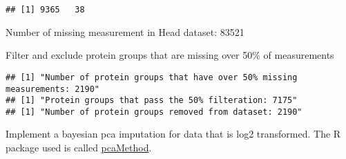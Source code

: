 \documentclass[]{article}
\begin{document}
\begin{verbatim}
## [1] 9365   38
\end{verbatim}

Number of missing measurement in Head dataset: 83521

Filter and exclude protein groups that are missing over 50\% of
measurements

\begin{verbatim}
## [1] "Number of protein groups that have over 50% missing measurements: 2190"
## [1] "Protein groups that pass the 50% filteration: 7175"
## [1] "Number of protein groups removed from dataset: 2190"
\end{verbatim}

Implement a bayesian pca imputation for data that is log2 transformed.
The R package used is called
\href{https://www.bioconductor.org/packages/devel/bioc/manuals/pcaMethods/man/pcaMethods.pdf}{pcaMethod}.
\end{document}
